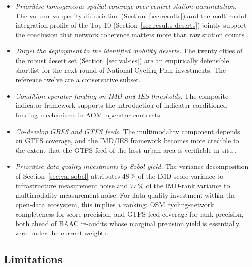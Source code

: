 \documentclass[11pt,a4paper]{article}
\begin{document}
\begin{itemize}
\item \emph{Prioritise homogeneous spatial coverage over central
station accumulation.} The volume-vs-quality dissociation
(Section~\ref{sec:results}) and the multimodal integration
profile of the Top-10 (Section~\ref{sec:results-deserts}) jointly
support the conclusion that network coherence matters more than
raw station counts \citep{ElGeneidy2016, Saberi2018}.
\item \emph{Target the deployment to the identified mobility
deserts.} The twenty cities of the robust desert set
(Section~\ref{sec:val-ies}) are an empirically defensible
shortlist for the next round of National Cycling Plan
investments. The reference twelve are a conservative subset.
\item \emph{Condition operator funding on IMD and IES
thresholds.} The composite indicator framework supports the
introduction of indicator-conditioned funding mechanisms in
AOM--operator contracts \citep{OECD2008}.
\item \emph{Co-develop GBFS and GTFS feeds.} The multimodality
component depends on GTFS coverage, and the IMD/IES framework
becomes more credible to the extent that the GTFS feed of the
host urban area is verifiable in situ \citep{Saberi2018,
Mobi2024}.
\item \emph{Prioritise data-quality investments by Sobol yield.}
The variance decomposition of Section~\ref{sec:val-sobol}
attributes 48\,\% of the IMD-score variance to infrastructure
measurement noise and 77\,\% of the IMD-rank variance to
multimodality measurement noise. For data-quality investment
within the open-data ecosystem, this implies a ranking: OSM
cycling-network completeness for score precision, and GTFS feed
coverage for rank precision, both ahead of BAAC re-audits whose
marginal precision yield is essentially zero under the current
weights.
\end{itemize}

\subsection{Limitations}
\end{document}
